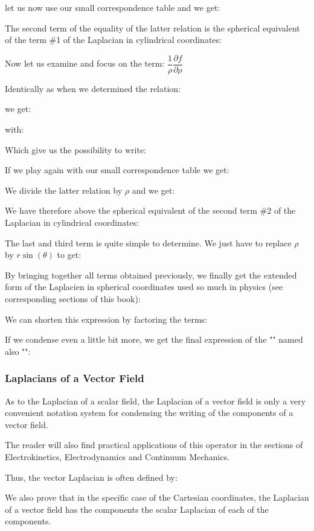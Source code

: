 	let us now use our small correspondence table and we get:
	
	The second term of the equality of the latter relation is the spherical equivalent of the term \#1 of the Laplacian in cylindrical coordinates:
	
	Now let us examine and focus on the term: $\dfrac{1}{\rho}\dfrac{\partial f}{\partial \rho}$
	
	Identically as when we determined the relation:
	
	we get:
	
	with:
	
	Which give us the possibility to write:
	
	If we play again with our small correspondence table we get:
	
	We divide the latter relation by $\rho$ and we get:
	
	We have therefore above the spherical equivalent of the second term \#2 of the Laplacian in cylindrical coordinates:
	
	The last and third term is quite simple to determine. We just have to replace $\rho$ by $r\sin(\theta)$ to get:
	
	By bringing together all terms obtained previously, we finally get the extended form of the Laplacien in spherical coordinates used so much in physics (see corresponding sections of this book):
	
	We can shorten this expression by factoring the terms:
	
	If we condense even a little bit more, we get the final expression of the "" named also "":
	
	
	\subsubsection{Laplacians of a Vector Field}
	As to the Laplacian of a scalar field, the Laplacian of a vector field is only a very convenient notation system for condensing the writing of the components of a vector field.
	
	The reader will also find practical applications of this operator in the sections of Electrokinetics, Electrodynamics and Continuum Mechanics.
	
	Thus, the vector Laplacian is often defined by:
	
	We also prove that in the specific case of the Cartesian coordinates, the Laplacian of a vector field has the components the scalar Laplacian of each of the components.
	
